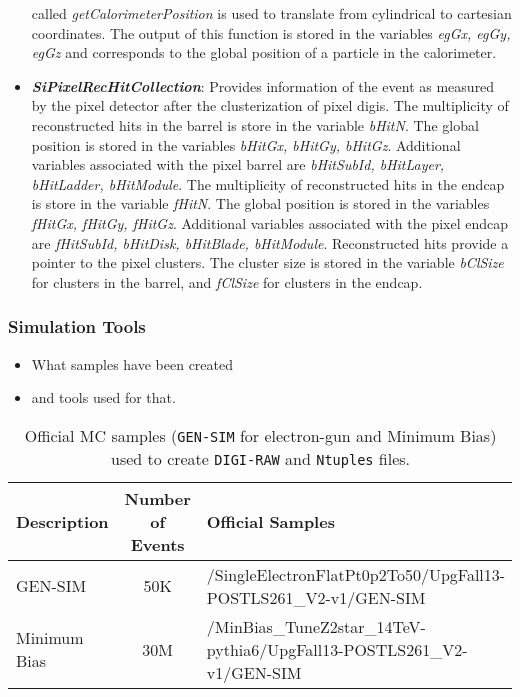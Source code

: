 \documentclass[a4paper,12pt,oneside]{article}
\begin{document}
\begin{itemize}
                     called {\it getCalorimeterPosition} is used to translate from cylindrical to cartesian coordinates. The output
                     of this function is stored in the variables {\it egGx, egGy, egGz} and corresponds to the global position of a
                     particle in the calorimeter.
                   \item \textbf{\textit{SiPixelRecHitCollection}}: Provides information of the event as measured by the pixel detector
                     after the clusterization of pixel digis. The multiplicity of reconstructed hits in the barrel is store in the
                     variable {\it bHitN}. The global position is stored in the variables {\it bHitGx, bHitGy, bHitGz}. Additional
                     variables associated with the pixel barrel are {\it bHitSubId, bHitLayer, bHitLadder, bHitModule}. The multiplicity
                     of reconstructed hits in the endcap is store in the variable {\it fHitN}. The global position is stored in the
                     variables {\it fHitGx, fHitGy, fHitGz}. Additional variables associated with the pixel endcap are
                     {\it fHitSubId, bHitDisk, bHitBlade, bHitModule}. Reconstructed hits provide a pointer to the pixel clusters.
                     The cluster size is stored in the variable {\it bClSize} for clusters in the barrel, and {\it fClSize} for
                     clusters in the endcap.
                   \end{itemize}


                   \subsubsection{Simulation Tools}

                   \begin{itemize}
                   \item What samples have been created
                   \item and tools used for that.
                   \end{itemize}
                   
                   


                   \begin{table}[!htb]
                     \centering
\scriptsize
                     \caption{Official MC samples (\texttt{GEN-SIM} for electron-gun and Minimum Bias) used to create \texttt{DIGI-RAW}
                       and \texttt{Ntuples} files.}
                     \label{}
                     \begin{tabular}{lcl}
\hline
{\bf Description} & {\bf Number of Events} & {\bf Official Samples} \\ \hline \hline
GEN-SIM           & 50K                    & /SingleElectronFlatPt0p2To50/UpgFall13-POSTLS261\_V2-v1/GEN-SIM \\ \hline
Minimum Bias      & 30M                    & /MinBias\_TuneZ2star\_14TeV-pythia6/UpgFall13-POSTLS261\_V2-v1/GEN-SIM \\ \hline
                     \end{tabular}
                   \end{table}
\end{document}
